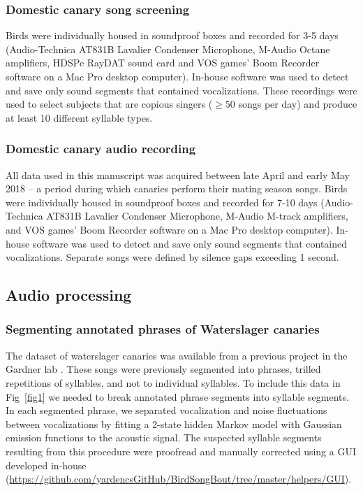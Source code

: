\documentclass[10pt,letterpaper]{article}
\begin{document}
\subsubsection*{Domestic canary song screening}
Birds were individually housed in soundproof boxes and recorded for 3-5 days (Audio-Technica AT831B Lavalier Condenser Microphone, M-Audio Octane amplifiers, HDSPe RayDAT sound card and VOS games’ Boom Recorder software on a Mac Pro desktop computer). In-house software was used to detect and save only sound segments that contained vocalizations. These recordings were used to select subjects that are copious singers ($\ge 50$ songs per day) and produce at least 10 different syllable types.
\subsubsection*{Domestic canary audio recording}
All data used in this manuscript was acquired between late April and early May 2018 – a period during which canaries perform their mating season songs. Birds were individually housed in soundproof boxes and recorded for 7-10 days (Audio-Technica AT831B Lavalier Condenser Microphone, M-Audio M-track amplifiers, and VOS games’ Boom Recorder software on a Mac Pro desktop computer). In-house software was used to detect and save only sound segments that contained vocalizations. Separate songs were defined by silence gaps exceeding 1 second.

\subsection*{Audio processing}
\subsubsection*{Segmenting annotated phrases of Waterslager canaries}
The dataset of waterslager canaries was available from a previous project in the Gardner lab \cite{markowitz_long-range_2013}. These songs were previously segmented into phrases, trilled repetitions of syllables, and not to individual syllables. To include this data in Fig~\ref{fig1} we needed to break annotated phrase segments into syllable segments. In each segmented phrase, we separated vocalization and noise fluctuations between vocalizations by fitting a 2-state hidden Markov model with Gaussian emission functions to the acoustic signal. The suspected syllable segments resulting from this procedure were proofread and manually corrected using a GUI developed in-house  (\url{https://github.com/yardencsGitHub/BirdSongBout/tree/master/helpers/GUI}).
\end{document}
